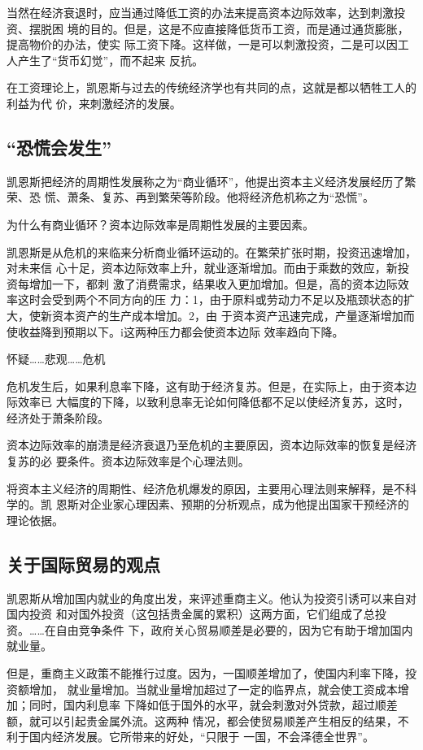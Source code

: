 当然在经济衰退时，应当通过降低工资的办法来提高资本边际效率，达到刺激投资、摆脱困
境的目的。但是，这是不应直接降低货币工资，而是通过通货膨胀，提高物价的办法，使实
际工资下降。这样做，一是可以刺激投资，二是可以因工人产生了“货币幻觉”，而不起来
反抗。

在工资理论上，凯恩斯与过去的传统经济学也有共同的点，这就是都以牺牲工人的利益为代
价，来刺激经济的发展。

\subsection{“恐慌会发生”}

凯恩斯把经济的周期性发展称之为“商业循环”，他提出资本主义经济发展经历了繁荣、恐
慌、萧条、复苏、再到繁荣等阶段。他将经济危机称之为“恐慌”。

为什么有商业循环？资本边际效率是周期性发展的主要因素。

凯恩斯是从危机的来临来分析商业循环运动的。在繁荣扩张时期，投资迅速增加，对未来信
心十足，资本边际效率上升，就业逐渐增加。而由于乘数的效应，新投资每增加一下，都刺
激了消费需求，结果收入更加增加。但是，高的资本边际效率这时会受到两个不同方向的压
力：1，由于原料或劳动力不足以及瓶颈状态的扩大，使新资本资产的生产成本增加。2，由
于资本资产迅速完成，产量逐渐增加而使收益降到预期以下。i这两种压力都会使资本边际
效率趋向下降。

怀疑……悲观……危机

危机发生后，如果利息率下降，这有助于经济复苏。但是，在实际上，由于资本边际效率已
大幅度的下降，以致利息率无论如何降低都不足以使经济复苏，这时，经济处于萧条阶段。

资本边际效率的崩溃是经济衰退乃至危机的主要原因，资本边际效率的恢复是经济复苏的必
要条件。资本边际效率是个心理法则。

将资本主义经济的周期性、经济危机爆发的原因，主要用心理法则来解释，是不科学的。凯
恩斯对企业家心理因素、预期的分析观点，成为他提出国家干预经济的理论依据。

\subsection{关于国际贸易的观点}

凯恩斯从增加国内就业的角度出发，来评述重商主义。他认为投资引诱可以来自对国内投资
和对国外投资（这包括贵金属的累积）这两方面，它们组成了总投资。……在自由竞争条件
下，政府关心贸易顺差是必要的，因为它有助于增加国内就业量。

但是，重商主义政策不能推行过度。因为，一国顺差增加了，使国内利率下降，投资额增加，
就业量增加。当就业量增加超过了一定的临界点，就会使工资成本增加；同时，国内利息率
下降如低于国外的水平，就会刺激对外贷款，超过顺差额，就可以引起贵金属外流。这两种
情况，都会使贸易顺差产生相反的结果，不利于国内经济发展。它所带来的好处，“只限于
一国，不会泽德全世界”。

